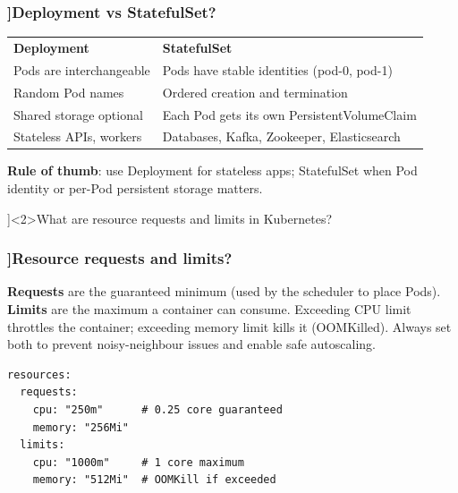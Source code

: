 \begin{frame}[fragile]
  \frametitle{\AnswerTitle[\CategoryBadge[DockerColor!20]{Docker \& K8s}]{Deployment vs StatefulSet?}}

  {\footnotesize
  \begin{tabular}{ll}
    \textbf{Deployment} & \textbf{StatefulSet} \\
    Pods are interchangeable & Pods have stable identities (pod-0, pod-1) \\
    Random Pod names & Ordered creation and termination \\
    Shared storage optional & Each Pod gets its own PersistentVolumeClaim \\
    Stateless APIs, workers & Databases, Kafka, Zookeeper, Elasticsearch \\
  \end{tabular}
  \vspace{0.5em}
  \textbf{Rule of thumb}: use Deployment for stateless apps; StatefulSet when Pod identity or per-Pod persistent storage matters.
  }
\end{frame}

\QuestionSlide[\CategoryBadge[DockerColor!20]{Docker \& K8s}]<2>{What are resource requests and limits in Kubernetes?}

\begin{frame}[fragile]
  \frametitle{\AnswerTitle[\CategoryBadge[DockerColor!20]{Docker \& K8s}]{Resource requests and limits?}}

  {\footnotesize
  \textbf{Requests} are the guaranteed minimum (used by the scheduler to place Pods). \textbf{Limits} are the maximum a container can consume. Exceeding CPU limit throttles the container; exceeding memory limit kills it (OOMKilled). Always set both to prevent noisy-neighbour issues and enable safe autoscaling.
  }

  \begin{verbatim}
resources:
  requests:
    cpu: "250m"      # 0.25 core guaranteed
    memory: "256Mi"
  limits:
    cpu: "1000m"     # 1 core maximum
    memory: "512Mi"  # OOMKill if exceeded
  \end{verbatim}
\end{frame}
